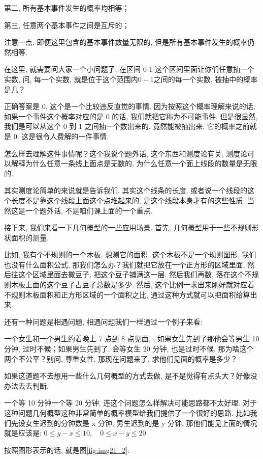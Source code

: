 第二, 所有基本事件发生的概率均相等；

第三, 任意两个基本事件之间是互斥的；

注意一点, 即便这里包含的基本事件数量无限的, 但是所有基本事件发生的概率仍然相等. 

在这里, 就需要问大家一个小问题了, 在区间 0-1 这个区间里面让你们任意抽一个实数, 问, 每一个实数, 就是位于这个范围内$0-1$之间的每一个实数, 被抽中的概率是几？

正确答案是 0, 这个是一个比较违反直觉的事情. 因为按照这个概率理解来说的话, 如果一个事件这个概率对应的是 0 的话, 我们就把它称为不可能事件. 但是很显然, 我们是可以从这个 0 到 1 之间抽一个数出来的. 竟然能被抽出来, 它的概率之前就是 0. 这是很令人费解的一件事情. 

怎么样去理解这件事情呢？这个我说个题外话, 这个东西和测度论有关, 测度论可以解释为什么任意一条线上面点是无数的, 为什么任意一个面上线段的数量是无限的. 

其实测度论简单的来说就是告诉我们, 其实这个线条的长度, 或者说一个线段的这个长度不是靠这个线段上面这个点堆起来的, 是这个线段本身才有的这些性质. 当然这是一个题外话, 不是咱们课上面的一个重点. 

接下来, 我们来看一下几何概型的一些应用场景. 首先, 几何概型用于一些不规则形状面积的测量. 

比如, 我有个不规则的一个木板, 想测它的面积. 这个木板不是一个规则图形, 我们也没有什么面积公式, 那我们怎么办？我们就把它放在一个正方形的区域里面, 然后往这个区域里面去撒豆子, 把这个豆子铺满这一层. 然后我们再数, 落在这个不规则木板上面的这个豆子占豆子总数是多少. 然后, 这个比例一求出来刚好就对应着不规则木板面积和正方形区域的一个面积之比, 通过这种方式就可以把面积给算出来. 

还有一种问题是相遇问题, 相遇问题我们一样通过一个例子来看: 

一个女生和一个男生约着晚上 7 点到 8 点见面, , 如果女生先到了那他会等男生 10 分钟, 过时不候；如果男生先到了, 会等女生 20 分钟, 也是过时不候. 那为啥这个两个不公平？别问, 尊重女性. 那现在问题来了, 求他们见面的概率是多少？

如果这道题不去想用一些什么几何概型的方式去做, 是不是觉得有点头大？好像没办法去去判断. 

一个等 10 分钟一个等 20 分钟, 连这个问题怎么样解决可能思路都不太好理. 对于这种问题几何概型这种非常简单的概率模型给我们提供了一个很好的思路. 比如我们先设女生迟到的分钟数是 x 分钟, 男生迟到的是 y 分钟. 那他们能见上面的情况就是应该是: $0 \le y-x \le 10, \quad 0 \le x-y \le 20$

按照图形表示的话, 就是图\ref{fig:img21_2}: 

